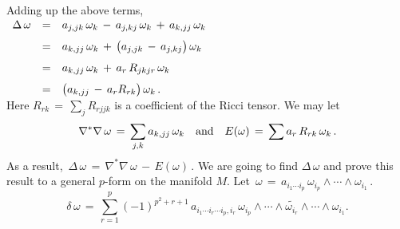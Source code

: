 \documentclass{article}[12pt,a4paper]
\begin{document}
Adding up the above terms, \\[0.1in]
$\begin{array}{rcl} 
\Delta\,\omega &=& \displaystyle 
	a_{j,jk}\, \omega_k \,-\, a_{j,kj}\, \omega_k \,+\, a_{k,jj}\, \omega_k \\[0.1in]
&=& \displaystyle 
	a_{k,jj}\,\omega_k \,+\, \big(a_{j,jk} \,-\, a_{j, kj}\big)\, \omega_k \\[0.1in]
&=& \displaystyle 
	a_{k,jj} \,\omega_k \,+\, a_r \, R_{jkjr}\, \omega_k \\[0.1in]
&=& \displaystyle 
	\big( a_{k,jj} \,-\, a_r R_{rk} \big) \,\omega_k \,.
\end{array}$\\[0.1in]

Here $R_{rk} \,=\, \sum_j R_{rjjk}$ is a coefficient of the Ricci tensor. 
We may let
$$ \nabla^{\ast} \nabla\,\omega \,=\, \sum_{j,k} a_{k,jj}\, \omega_k \quad \mbox{and} \quad
E(\omega) \,=\, \sum a_r\,R_{rk}\, \omega_k\,.$$ 
As a result, \,$\Delta\,\omega \,=\, \nabla^\ast \nabla\,\omega \,-\, E(\omega)$\,.
We are going to find $\Delta\,\omega$ and prove this result to a general $p$-form on the manifold $M$. 
Let \,$\omega \,=\, a_{i_1\cdots i_p}\, \omega_{i_p}\wedge\cdots\wedge\omega_{i_1}$\,. \\
$$ \delta\,\omega \,=\,
	\sum_{r=1}^p (-1)^{p^2+r+1}\, a_{i_1\cdots i_r\cdots i_p,i_r}\, \omega_{i_p}\wedge\cdots\wedge \widetilde{\omega_{i_r}}
	\wedge\cdots\wedge \omega_{i_1}. $$
\end{document}
